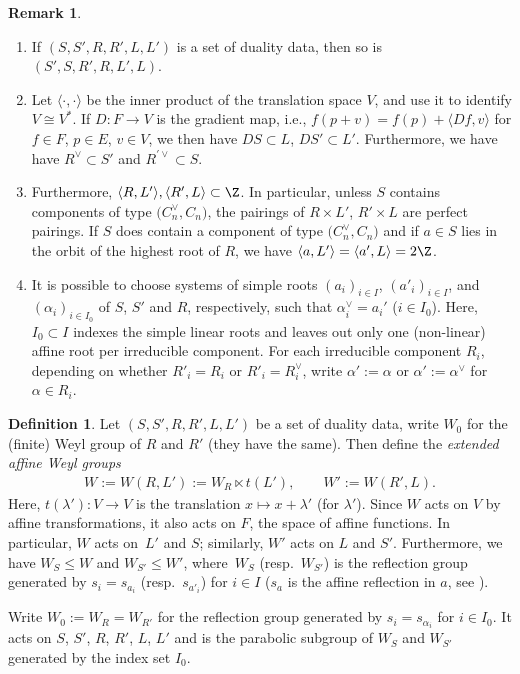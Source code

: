 \documentclass[10pt,a4paper]{amsart}
\theoremstyle{definition}
\newtheorem{Definition}[Theorem]{Definition}
\newtheorem{Remark}[Theorem]{Remark}
\numberwithin{equation}{section}
\begin{document}
\begin{Remark}\qquad
\begin{enumerate}\itemsep=0pt
 \item[(i)]
 If $(S,S',R,R',L,L')$ is a set of duality data, then so is
 $(S',S,R',R,L',L)$.
 \item[(ii)]
 Let $\langle\cdot,\cdot\rangle$ be the inner product of the translation
 space $V$, and use it to identify $V\cong V^*$. If $D\colon F\to V$ is the gradient map, i.e.,
 $f(p+v)=f(p) + \langle Df, v\rangle$ for $f\in F$, $p\in E$, $v\in V$, we then have $DS\subset L$, $DS'\subset L'$. Furthermore, we have
 have $R^\vee\subset S'$ and $R^{\prime\vee}\subset S$.
 \item[(iii)]
 Furthermore, $\langle R, L'\rangle,\langle R',L\rangle\subset\Z$. In
 particular, unless $S$ contains components of type $\bigl(C_n^\vee, C_n\bigr)$, the pairings of $R\times L'$, $R'\times L$ are
 perfect pairings. If $S$ does contain a component of type $\bigl(C_n^\vee, C_n\bigr)$ and if $a\in S$ lies in the orbit of the
 highest root of $R$, we have $\langle a, L'\rangle=\langle a',L\rangle=2\Z$.
 \item[(iv)]
 It is possible to choose systems of simple roots $(a_i)_{i\in I}$, $(a'_i)_{i\in I}$, and
 $(\alpha_i)_{i\in I_0}$ of $S$, $S'$ and $R$, respectively, such that $\alpha_i^\vee=a_i'$ ($i\in I_0$). Here, $I_0\subset I$ indexes the
 simple linear roots and leaves out only one (non-linear) affine root per
 irreducible component. For each irreducible component $R_i$, depending on whether $R'_i=R_i$ or $R'_i=R_i^\vee$, write
 $\alpha':=\alpha$ or $\alpha':=\alpha^\vee$ for~${\alpha\in R_i}$.
\end{enumerate}
\end{Remark}

\begin{Definition}
 Let $(S,S',R,R',L,L')$ be a set of duality data, write
 $W_0$ for the (finite) Weyl group of $R$ and $R'$ (they have the same).
 Then define the \emph{extended affine Weyl groups}
 \begin{align*}
 W:= W(R,L') := W_R\ltimes t(L'),\qquad
 W':= W(R',L).
 \end{align*}
 Here, $t(\lambda')\colon V\to V$ is the translation $x\mapsto x + \lambda'$
 (for $\lambda'$). Since $W$ acts on $V$ by affine transformations,
 it also acts on $F$, the space of affine functions. In particular,
 $W$ acts on~$L'$ and $S$; similarly, $W'$ acts on $L$ and $S'$. Furthermore, we have
 $W_S\le W$ and $W_{S'}\le W'$, where~$W_S$ (resp.\ $W_{S'}$)
 is the reflection group generated by $s_i=s_{a_i}$ (resp.\ $s_{a'_i}$)
 for $i\in I$ ($s_a$ is the affine reflection in $a$, see \cite[Section~1.1.6]{macdonald}).

 Write $W_0:= W_{R}=W_{R'}$ for the reflection group generated by $s_i = s_{\alpha_i}$ for $i\in I_0$. It acts on $S$, $S'$, $R$, $R'$, $L$, $L'$ and is
 the parabolic subgroup of $W_S$ and $W_{S'}$ generated by the
 index set $I_0$.
\end{Definition}
\end{document}
